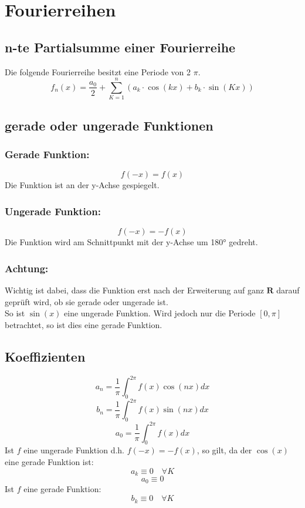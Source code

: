 \section{Fourierreihen}

\subsection{n-te Partialsumme einer Fourierreihe}
Die folgende Fourierreihe besitzt eine Periode von 2 $\pi$. 
\[ \boxed{f_n(x) = \frac{a_0}{2} + \sum_{K=1}^n \left(a_k \cdot \cos(kx) + b_k \cdot \sin(Kx)\right)} \]

\subsection{gerade oder ungerade Funktionen}

\subsubsection{Gerade Funktion: }
\[ \boxed{f(-x) = f(x)} \]
Die Funktion ist an der y-Achse gespiegelt. 
\subsubsection{Ungerade Funktion: }
\[ \boxed{f(-x) = -f(x)} \]
Die Funktion wird am Schnittpunkt mit der y-Achse um 180° gedreht. 
\subsubsection{Achtung: }
Wichtig ist dabei, dass die Funktion erst nach der Erweiterung auf ganz $\mathbf{R}$ darauf geprüft wird, ob sie gerade oder ungerade ist. \\
So ist $\sin(x)$ eine ungerade Funktion. Wird jedoch nur die Periode $[0, \pi]$ betrachtet, so ist dies eine gerade Funktion. 

\begin{figure}[h!]
\centering
\end{figure}

\subsection{Koeffizienten}
\[ \boxed{a_n = \frac{1}{\pi} \int_0^{2 \pi} f(x) \cos(nx) dx} \]
\[ \boxed{b_n = \frac{1}{\pi} \int_0^{2 \pi} f(x) \sin(nx) dx} \]
\[ \boxed{a_0 = \frac{1}{\pi} \int_0^{2 \pi} f(x) dx
} \]
Ist $f$ eine ungerade Funktion d.h. $f(-x) = -f(x)$, so gilt, da der $\cos(x)$ eine gerade Funktion ist: 
\[ a_k \equiv 0 \quad \forall K\]
\[ a_0 \equiv 0 \]
Ist $f$ eine gerade Funktion: 
\[ b_k \equiv 0 \quad \forall K \]

